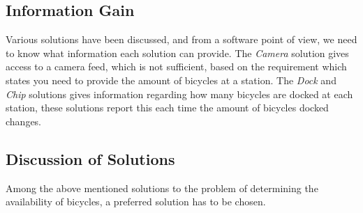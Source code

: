 \begin{comment}
\subsection{WiFi}\fxwarning{This doen't work, delete maybe?}
Using WiFi to transmit from the bicycles to the station if they are near, is another solution that could be used.
This solution captures the bicycles located in a perimeter around the station that are on the WiFi network.

This solution provides an estimate of the amount of bicycles available at a given station.
It requires very little in terms of extra infrastructure having to be built.

It is unclear what costs would be involved with this system and how the bicycles would be powered to maintain the WiFi signal for a longer period of time. 
Maintaining the WiFi signal for a longer period of time when not bicycling may not be necessary as you could assume that when a bicycle is not active, it stays at the same place.
If that is the case, it could be enough to transmit your position when near a station and bicycling, thus powering the WiFi with kinetic energy.
\end{comment}

\subsection{Information Gain}
Various solutions have been discussed, and from a software point of view, we need to know what information each solution can provide.
The \textit{Camera} solution gives access to a camera feed, which is not sufficient, based on the requirement which states you need to provide the amount of bicycles at a station.
The \textit{Dock} and \textit{Chip} solutions gives information regarding how many bicycles are docked at each station, these solutions report this each time the amount of bicycles docked changes.

\subsection{Discussion of Solutions}
Among the above mentioned solutions to the problem of determining the availability of bicycles, a preferred solution has to be chosen. 

